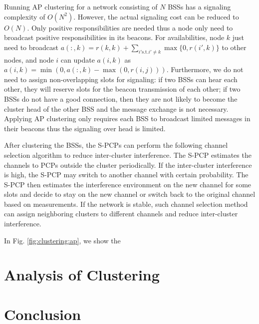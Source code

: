 \documentclass[10pt, conference, letterpaper]{IEEEtran}
\begin{document}
Running AP clustering for a network consisting of $N$ BSSs has a signaling complexity of $O(N^2)$. However, the actual signaling cost can be reduced to $O(N)$. Only positive responsibilities are needed thus a node only need to broadcast positive responsibilities in its beacons. For availabilities, node $k$ just need to broadcast $a(:,k) = r(k,k)+\sum_{i'\text{s.t.}i'\neq k}\max \{0, r(i',k) \}$ to other nodes, and node $i$ can update $a(i,k)$ as $a(i, k) = \min(0,a(:,k) - \max(0, r(i,j)))$. Furthermore, we do not need to assign non-overlapping slots for signaling: if two BSSs can hear each other, they will reserve slots for the beacon transmission of each other; if two BSSs do not have a good connection, then they are not likely to become the cluster head of the other BSS and the message exchange is not necessary. Applying AP clustering only requires each BSS to broadcast limited messages in their beacons thus the signaling over head is limited. 

After clustering the BSSs, the S-PCPs can perform the following channel selection algorithm to reduce inter-cluster interference. The S-PCP estimates the channels to PCPs outside the cluster periodically. If the inter-cluster interference is high, the S-PCP may switch to another channel with certain probability. The S-PCP then estimates the interference environment on the new channel for some slots and decide to stay on the new channel or switch back to the original channel based on measurements. If the network is stable, such channel selection method can assign neighboring clusters to different channels and reduce inter-cluster interference.

In Fig. \ref{fig:clustering:ap}, we show the 


\section{Analysis of Clustering}\label{section:clusteranalysis}



\section{Conclusion}\label{section:conclusion}
\end{document}
